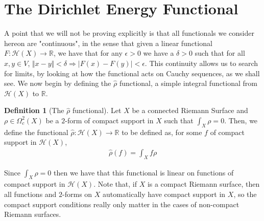 \documentclass[11pt]{report}
\theoremstyle{definition}
\newtheorem{defn}[thm]{Definition}
\begin{document}
\section{The Dirichlet Energy Functional}

A point that we will not be proving explicitly is that all functionals we consider hereon are "continuous", in the sense that given a linear functional $F:\mathcal{H}(X) \rightarrow \mathbb{R}$, we have that for any $\epsilon > 0$ we have a $\delta > 0$ such that for all $x,y \in V$, $\Vert x - y \Vert < \delta \Rightarrow |F(x) - F(y)| < \epsilon$. This continuity allows us to search for limits, by looking at how the functional acts on Cauchy sequences, as we shall see.
We now begin by defining the $\hat{\rho}$ functional, a simple integral functional from $\mathcal{H}(X)$ to $\mathbb{R}$. 

\begin{defn}[The $\hat{\rho}$ functional]
  Let $X$ be a connected Riemann Surface and $\rho \in \Omega^2_c(X)$ be a $2$-form of compact support in $X$ such that $\int_X \rho = 0$. Then, we define the functional $\hat{\rho} \colon \mathcal{H}(X) \rightarrow \mathbb{R}$ to be defined as, for some $f$ of compact support in $\mathcal{H}(X)$,
  \begin{align*}
    \hat{\rho}(f) = \int_X f\rho
  \end{align*}
\end{defn}

Since $\int_X \rho = 0$ then we have that this functional is linear on functions of compact support in $\mathcal{H}(X)$. Note that, if $X$ is a compact Riemann surface, then all functions and $2$-forms on $X$ automatically have compact support in $X$, so the compact support conditions really only matter in the cases of non-compact Riemann surfaces.
\end{document}
